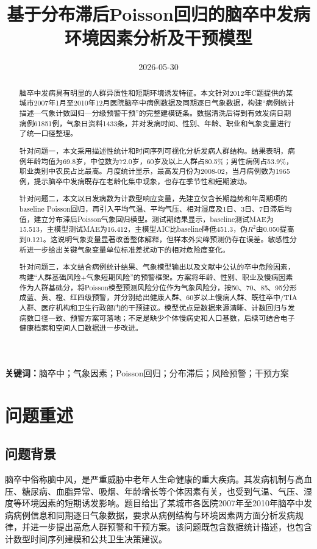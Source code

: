 \documentclass[UTF8,a4paper,12pt]{ctexart}
\title{\heiti 基于分布滞后Poisson回归的脑卒中发病环境因素分析及干预模型}
\author{}
\date{2026-05-30}
\begin{document}
\maketitle
\begin{abstract}
脑卒中发病具有明显的人群异质性和短期环境诱发特征。本文针对2012年C题提供的某城市2007年1月至2010年12月医院脑卒中病例数据及同期逐日气象数据，构建“病例统计描述—气象计数回归—分级预警干预”的完整建模链条。数据清洗后得到有效发病日期病例61851例，气象日资料1433条，并对发病时间、性别、年龄、职业和气象变量进行了统一口径整理。

针对问题一，本文采用描述性统计和时间序列可视化分析发病人群结构。结果表明，病例年龄均值为69.8岁，中位数为72.0岁，60岁及以上人群占80.5\%；男性病例占53.9\%，职业类别中农民占比最高。月度统计显示，最高发月份为2008-02，当月病例数为1965例，提示脑卒中发病既存在老龄化集中现象，也存在季节性和短期波动。

针对问题二，本文以日发病数为计数型响应变量，先建立仅含长期趋势和年周期项的baseline Poisson回归，再引入平均气温、平均气压、相对湿度及1日、3日、7日滞后均值，建立分布滞后Poisson气象回归模型。测试期结果显示，baseline测试MAE为15.513，主模型测试MAE为16.412，主模型AIC比baseline降低451.3，伪$R^2$由0.050提高到0.121。这说明气象变量显著改善整体解释，但样本外尖峰预测仍存在误差。敏感性分析进一步给出关键气象变量单位标准差扰动下的相对危险度变化。

针对问题三，本文结合病例统计结果、气象模型输出以及文献中公认的卒中危险因素，构建“人群基础风险+气象短期风险”的预警框架。方案将年龄、性别、职业及慢病因素作为人群基础分，将Poisson模型预测风险分位作为气象风险分，按50、70、85、95分形成蓝、黄、橙、红四级预警，并分别给出健康人群、60岁以上慢病人群、既往卒中/TIA人群、医疗机构和卫生行政部门的干预建议。模型优点是数据来源清晰、计数回归与发病数口径一致、预警方案可落地；不足是缺少个体慢病史和人口基数，后续可结合电子健康档案和空间人口数据进一步改进。
\end{abstract}
\noindent\textbf{关键词：}脑卒中；气象因素；Poisson回归；分布滞后；风险预警；干预方案
\newpage
\tableofcontents
\newpage

\section{问题重述}
\subsection{问题背景}
脑卒中俗称脑中风，是严重威胁中老年人生命健康的重大疾病。其发病机制与高血压、糖尿病、血脂异常、吸烟、年龄增长等个体因素有关，也受到气温、气压、湿度等环境因素的短期诱发影响。题目给出了某城市各医院2007年至2010年脑卒中发病病例信息和同期逐日气象数据，要求从病例结构与环境因素两方面分析发病规律，并进一步提出高危人群预警和干预方案。该问题既包含数据统计描述，也包含计数型时间序列建模和公共卫生决策建议。
\end{document}
